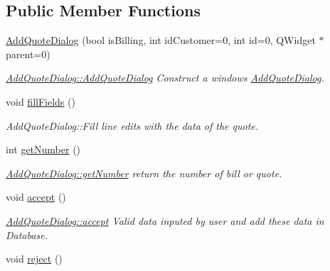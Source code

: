 \subsection*{Public Member Functions}
\begin{DoxyCompactItemize}
\item 
\hyperlink{classGui_1_1Dialogs_1_1AddQuoteDialog_ae6a6d0730d6ec3804ab802821e89ebd5}{Add\-Quote\-Dialog} (bool is\-Billing, int id\-Customer=0, int id=0, Q\-Widget $\ast$parent=0)
\begin{DoxyCompactList}\small\item\em \hyperlink{classGui_1_1Dialogs_1_1AddQuoteDialog_ae6a6d0730d6ec3804ab802821e89ebd5}{Add\-Quote\-Dialog\-::\-Add\-Quote\-Dialog} Construct a windows \hyperlink{classGui_1_1Dialogs_1_1AddQuoteDialog}{Add\-Quote\-Dialog}. \end{DoxyCompactList}\item 
\hypertarget{classGui_1_1Dialogs_1_1AddQuoteDialog_a5dd0cca14b1172a7e1dd9019d8fa8ff3}{void \hyperlink{classGui_1_1Dialogs_1_1AddQuoteDialog_a5dd0cca14b1172a7e1dd9019d8fa8ff3}{fill\-Fields} ()}\label{classGui_1_1Dialogs_1_1AddQuoteDialog_a5dd0cca14b1172a7e1dd9019d8fa8ff3}

\begin{DoxyCompactList}\small\item\em Add\-Quote\-Dialog\-::\-Fill line edits with the data of the quote. \end{DoxyCompactList}\item 
int \hyperlink{classGui_1_1Dialogs_1_1AddQuoteDialog_a68b6b01e0818cb6615b2335d486aac09}{get\-Number} ()
\begin{DoxyCompactList}\small\item\em \hyperlink{classGui_1_1Dialogs_1_1AddQuoteDialog_a68b6b01e0818cb6615b2335d486aac09}{Add\-Quote\-Dialog\-::get\-Number} return the number of bill or quote. \end{DoxyCompactList}\item 
\hypertarget{classGui_1_1Dialogs_1_1AddQuoteDialog_abcc6fc79a513dd1765a4494d9499586b}{void \hyperlink{classGui_1_1Dialogs_1_1AddQuoteDialog_abcc6fc79a513dd1765a4494d9499586b}{accept} ()}\label{classGui_1_1Dialogs_1_1AddQuoteDialog_abcc6fc79a513dd1765a4494d9499586b}

\begin{DoxyCompactList}\small\item\em \hyperlink{classGui_1_1Dialogs_1_1AddQuoteDialog_abcc6fc79a513dd1765a4494d9499586b}{Add\-Quote\-Dialog\-::accept} Valid data inputed by user and add these data in Database. \end{DoxyCompactList}\item 
\hypertarget{classGui_1_1Dialogs_1_1AddQuoteDialog_a1ae935c40fb54142aad3a610a137bd36}{void \hyperlink{classGui_1_1Dialogs_1_1AddQuoteDialog_a1ae935c40fb54142aad3a610a137bd36}{reject} ()}\label{classGui_1_1Dialogs_1_1AddQuoteDialog_a1ae935c40fb54142aad3a610a137bd36}


\end{DoxyCompactItemize}
